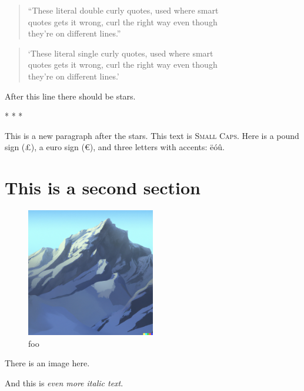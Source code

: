 \documentclass[
  12pt,
  a4paper,
]{article}
\begin{document}
\begin{quote}
``These literal double curly quotes, used where smart\\
quotes gets it wrong, curl the right way even though\\
they're on different lines.''
\end{quote}

\begin{quote}
`These literal single curly quotes, used where smart\\
quotes gets it wrong, curl the right way even though\\
they're on different lines.'
\end{quote}

After this line there should be stars.

\begin{center}* * *\end{center}

\makeatletter
\@afterindentfalse
\@afterheading
\makeatother

This is a new paragraph after the stars. This text is \textsc{Small
Caps}. Here is a pound sign (£), a euro sign (€), and three letters with
accents: ëóû.

\hypertarget{__h1_2}{%
\section{This is a second section}\label{__h1_2}}

\begin{figure}
\centering
\includegraphics[width=0.5\textwidth,height=\textheight]{tests/test2/image.png}
\caption{foo}
\end{figure}

There is an image here.

And this is \emph{even more italic text}.
\end{document}
